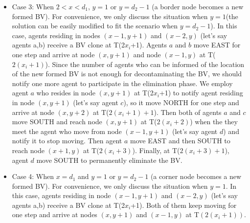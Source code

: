 \begin{itemize}
\item Case 3: When $2<x<d_1$, $y=1$ or $y=d_2-1$ (a border node becomes a new formed BV). For convenience, we only discuss the situation when $y=1$(the solution can be easily modified to fit the scenario when $y=d_2-1$). In this case, agents residing in nodes $(x-1, y+1)$ and $(x-2, y)$ (let's say agents a,b) receive a BV clone at T(2$x_i$+1). Agents $a$ and $b$ move EAST for one step and arrive at node $(x, y+1)$ and node $(x-1, y)$ at T($2(x_i+1)$). Since the number of agents who can be informed of the location of the new formed BV is not enough for decontaminating the BV, we should notify one more agent to participate in the elimination phase. We employ agent $a$ who resides in node $(x, y+1)$ at T(2$x_i$+1) to notify agent residing in node $(x, y+1)$ (let's say agent $c$), so it move NORTH for one step and arrive at node $(x, y+2)$ at T($2(x_i+1)+1$). Then both of agents $a$ and $c$ move SOUTH and reach node $(x, y+1)$ at T($2(x_i+2)$) when the they meet the agent who move from node $(x-1, y+1)$ (let's say agent $d$) and notify it to stop moving. Then agent $a$ move EAST and then SOUTH to reach node $(x+1, y)$ at T($2(x_i+3)$). Finally, at T($2(x_i+3)+1$), agent $d$ move SOUTH to permanently eliminate the BV.
\item Case 4: When $x=d_1$ and $y=1$ or $y=d_2-1$ (a corner node becomes a new formed BV). For convenience, we only discuss the situation when $y=1$. In this case, agents residing in node $(x-1, y+1)$ and $(x-2, y)$ (let's say agents a,b) receive a BV clone at T(2$x_i$+1). Both of them keep moving for one step and arrive at nodes $(x, y+1)$ and $(x-1, y)$ at T$(2(x_i+1))$.

\end{itemize}










